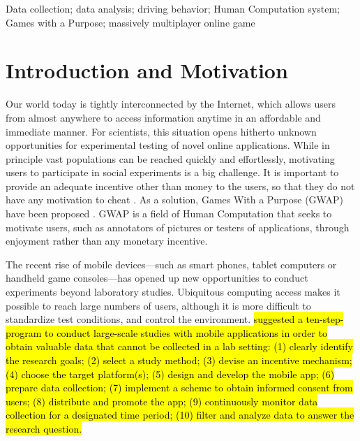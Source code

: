 \documentclass[preprint,authoryear,12pt]{elsarticle}
\begin{document}
\begin{frontmatter}
\begin{keyword}
Data collection; data analysis; driving behavior; Human Computation system; Games with a Purpose; massively multiplayer online game
\end{keyword}

\end{frontmatter}

\section{Introduction and Motivation}\label{sec:intro}



Our world today is tightly interconnected by the Internet, which allows users from almost anywhere to access information anytime in an affordable and immediate manner. For scientists, this situation opens hitherto unknown opportunities for experimental testing of novel online applications. While in principle vast populations can  be reached quickly and effortlessly, motivating users to participate in social experiments is a big challenge. It is important to provide an adequate incentive other than money to the users, so that they do not have any motivation to cheat \citep{Quinn}.
As a solution, Games With a Purpose (GWAP) have been proposed \citep{vonAhn2006Games}. GWAP is a field of Human Computation \citep{Yuen.2009,Krause+Smeddinck.2011} that seeks to motivate users, such as annotators of pictures or testers of applications, through enjoyment rather than any monetary incentive.

The recent rise of mobile devices---such as smart phones, tablet computers or handheld game consoles---has opened up new opportunities to conduct experiments beyond laboratory studies. Ubiquitous computing access makes it possible to reach large numbers of users, although it is more difficult to standardize test conditions, and control the environment.
\cite{Henze2013} \hl{suggested a ten-step-program to conduct large-scale studies with mobile applications in order to obtain valuable data that cannot be collected in a lab setting: (1) clearly identify the research goals; (2) select a study method; (3) devise an incentive mechanism;  (4) choose the target platform(s); (5) design and develop the mobile app; (6) prepare data collection; (7) implement a scheme to obtain informed consent from users; (8) distribute and promote the app; (9) continuously monitor data collection for a designated time period; (10) filter and analyze data to answer the research question.}
\end{document}
